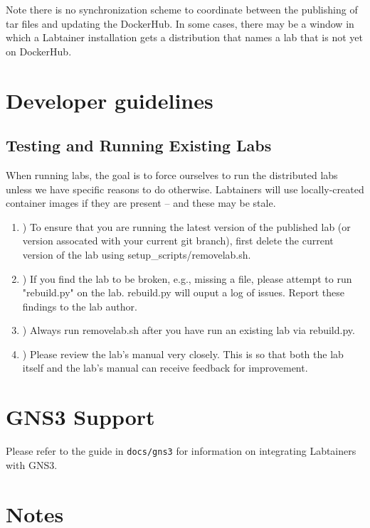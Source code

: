 \documentclass[12pt]{article}
\begin{document}
Note there is no synchronization scheme to coordinate between the publishing of tar files and updating the
DockerHub.  In some cases, there may be a window in which a Labtainer installation gets a distribution that names
a lab that is not yet on DockerHub.

\section{Developer guidelines}
\subsection{Testing and Running Existing Labs}
When running labs, the goal is to force ourselves to run the distributed labs unless we have specific reasons to do otherwise.
Labtainers will use locally-created container images if they are present -- and these may be stale.
\begin{enumerate}[label=\Alph*]
	\item )   To ensure that you are running the latest version of the published lab (or version assocated with your current git branch), first delete the current version of the lab using setup\_scripts/removelab.sh.  

	\item )   If you find the lab to be broken, e.g., missing a file, please attempt to run "rebuild.py" on the lab. rebuild.py will ouput a log of issues. Report these findings to the lab author.  

	\item )   Always run removelab.sh after you have run an existing lab via rebuild.py.  

	\item )   Please review the lab's manual very closely. This is so that both the lab itself and the lab's manual can receive feedback for improvement. 
\end{enumerate}

\section{GNS3 Support}
Please refer to the guide in {\tt docs/gns3} for information on integrating Labtainers with GNS3.

\section {Notes}
\end{document}
